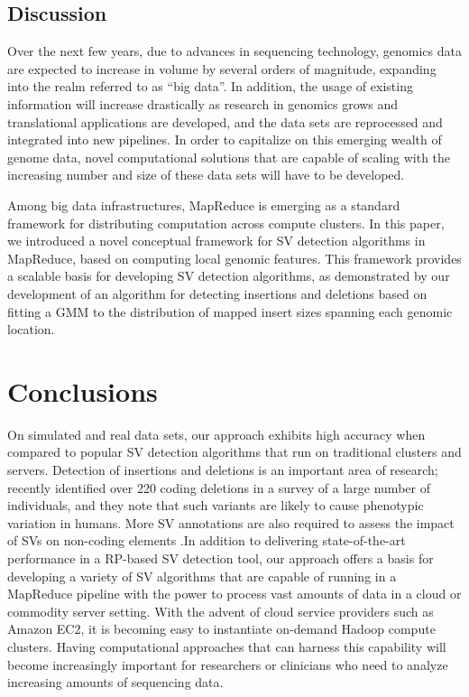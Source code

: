 \documentclass[10pt]{bmc_article}
\newenvironment{bmcformat}{\fussy\setboolean{publ}{true}}{\fussy}
\begin{document}
\begin{bmcformat}
\subsection*{Discussion}

Over the next few years, due to advances in sequencing technology, genomics data are expected to increase in volume by several orders of magnitude, expanding into the realm referred to as ``big data''. In addition, the usage of existing information will increase drastically as research in genomics grows and translational applications are developed, and the data sets are reprocessed and integrated into new pipelines. In order to capitalize on this emerging wealth of genome data, novel computational solutions that are capable of scaling with the increasing number and size of these data sets will have to be developed. 

Among big data infrastructures, MapReduce is emerging as a standard framework for distributing computation across compute clusters. In this paper, we introduced a novel conceptual framework for SV detection algorithms in MapReduce, based on computing local genomic features. This framework provides a scalable basis for developing SV detection algorithms, as demonstrated by our development of an algorithm for detecting insertions and deletions based on fitting a GMM to the distribution of mapped insert sizes spanning each genomic location.

\section*{Conclusions}

On simulated and real data sets, our approach exhibits high accuracy when compared to popular SV detection algorithms that run on traditional clusters and servers. Detection of insertions and deletions is an important area of research; \cite{Mills:2011fi} recently identified over 220 coding deletions in a survey of a large number of individuals, and they note that such variants are likely to cause phenotypic variation in humans. More SV annotations are also required to assess the impact of SVs on non-coding elements \cite{Mu:2011br}.In addition to delivering state-of-the-art performance in a RP-based SV detection tool, our approach offers a basis for developing a variety of SV algorithms that are capable of running in a MapReduce pipeline with the power to process vast amounts of data in a cloud or commodity server setting. With the advent of cloud service providers such as Amazon EC2, it is becoming easy to instantiate on-demand Hadoop compute clusters. Having computational approaches that can harness this capability will become increasingly important for researchers or clinicians who need to analyze increasing amounts of sequencing data.


\end{bmcformat}
\end{document}
